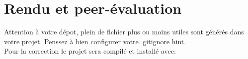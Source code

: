 \documentclass{42}
\begin{document}
\chapter{Rendu et peer-\'evaluation}

	Attention \`a votre d\'epot, plein de fichier plus ou moins utiles sont
	g\'en\'er\'es dans votre projet. Penssez \`a bien configurer votre
	.gitignore \href{https://www.gitignore.io}{hint}.\\
	
	\vspace{5mm}
	Pour la correction le projet sera compil\'e et install\'e avec:\\
\end{document}
